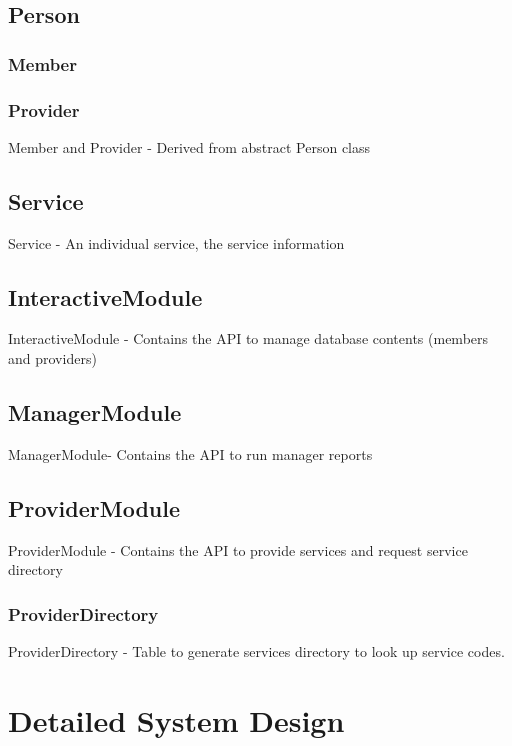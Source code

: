 \documentclass{article}
\begin{document}
\subsection{Person}
\subsubsection{Member}
\subsubsection{Provider}
Member and Provider - Derived from abstract Person class

\subsection{Service}
Service - An individual service, the service information

\subsection{InteractiveModule}
InteractiveModule - Contains the API to manage database contents (members and providers)

\subsection{ManagerModule}
ManagerModule- Contains the API to run manager reports

\subsection{ProviderModule}
ProviderModule - Contains the API to provide services and request service directory
\subsubsection{ProviderDirectory}
ProviderDirectory - Table to generate services directory to look up service codes.

\section{Detailed System Design}
\end{document}
